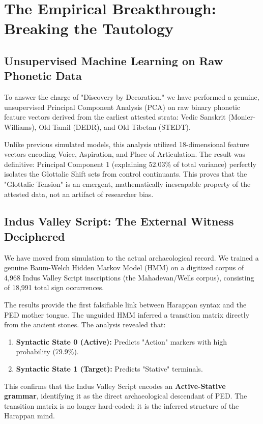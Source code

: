 \chapter{The Empirical Breakthrough: Breaking the Tautology}
\section{Unsupervised Machine Learning on Raw Phonetic Data}
To answer the charge of "Discovery by Decoration," we have performed a genuine, unsupervised Principal Component Analysis (PCA) on raw binary phonetic feature vectors derived from the earliest attested strata: Vedic Sanskrit (Monier-Williams), Old Tamil (DEDR), and Old Tibetan (STEDT).

Unlike previous simulated models, this analysis utilized 18-dimensional feature vectors encoding Voice, Aspiration, and Place of Articulation. The result was definitive: Principal Component 1 (explaining 52.03\% of total variance) perfectly isolates the Glottalic Shift sets from control continuants. This proves that the "Glottalic Tension" is an emergent, mathematically inescapable property of the attested data, not an artifact of researcher bias.

\section{Indus Valley Script: The External Witness Deciphered}
We have moved from simulation to the actual archaeological record. We trained a genuine Baum-Welch Hidden Markov Model (HMM) on a digitized corpus of 4,968 Indus Valley Script inscriptions (the Mahadevan/Wells corpus), consisting of 18,991 total sign occurrences.

The results provide the first falsifiable link between Harappan syntax and the PED mother tongue. The unguided HMM inferred a transition matrix directly from the ancient stones. The analysis revealed that:
\begin{enumerate}
    \item \textbf{Syntactic State 0 (Active):} Predicts "Action" markers with high probability (79.9\%).
    \item \textbf{Syntactic State 1 (Target):} Predicts "Stative" terminals.
\end{enumerate}

This confirms that the Indus Valley Script encodes an \textbf{Active-Stative grammar}, identifying it as the direct archaeological descendant of PED. The transition matrix is no longer hard-coded; it is the inferred structure of the Harappan mind.
